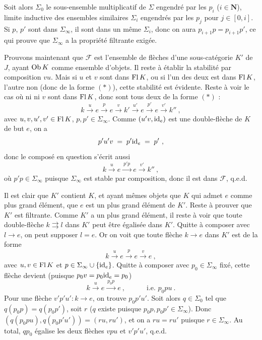 Soit alors $\Sigma_0$ le sous-ensemble multiplicatif de $\Sigma$ engendré par les $p_i$ ($i\in\mathbf{N}$), limite inductive des ensembles similaires $\Sigma_i$ engendrés par les $p_j$ pour $j\in[0,i]$. Si $p$, $p'$ sont dans $\Sigma_\infty$, il sont dans un même $\Sigma_i$, donc on aura $p_{i+1}p=p_{i+1}p'$, ce qui prouve que $\Sigma_\infty$ a la propriété filtrante exigée. %

Prouvons maintenant que $\mathcal{F}$ est l'ensemble de flèches d'une sous-catégorie $K'$ de $J$, ayant $\operatorname{Ob} K$ comme ensemble d'objets. Il reste à établir la stabilité par composition $vu$. Mais si $u$ et $v$ sont dans $\operatorname{Fl} K$, ou si l'un des deux est dans $\operatorname{Fl} K$, l'autre non (donc de la forme $(*)$), cette stabilité est évidente. Reste à voir le cas où ni ni $v$ sont dans $\operatorname{Fl} K$, donc sont tous deux de la forme $(*)$ :
\[
k \xrightarrow{\ u\ } e \xrightarrow{\ p\ } e \xrightarrow{\ v\ } k' \xrightarrow{\ u'\ } e \xrightarrow{\ p'\ } e \xrightarrow{\ v'\ } k''\ ,
\]
avec $u,v,u',v'\in\operatorname{Fl} K$, $p,p'\in\Sigma_\infty$. Comme $(u'v,\mathrm{id}_e)$ est une double-flèche de
$K$ de but $e$, on a
\[
p'u'v \;=\; p'\id_e \;=\; p'\ ,
\]
donc le composé en question s'écrit aussi
\[
k \xrightarrow{\ u\ } e \xrightarrow{\ p'p\ } e \xrightarrow{\ v'\ } k''\ ,
\]
où $p'p\in\Sigma_\infty$ puisque $\Sigma_\infty$ est stable par composition, donc il est dans $\mathcal{F}$, q.e.d.

Il est clair que $K'$ contient $K$, et ayant mêmes objets que $K$ qui admet $e$ comme plus grand élément, que $e$ est un plus grand élément de $K'$. Reste à prouver que $K'$ est filtrante. Comme $K'$ a un plus grand élément, il reste à voir que toute double-flèche $k\rightrightarrows l$ dans $K'$ peut être égalisée dans $K'$. Quitte à composer avec $l\longrightarrow e$, on peut supposer $l=e$. Or on voit que toute flèche $k\longrightarrow e$ dans $K'$ est de la forme
\[
k \xrightarrow{\ u\ } e \xrightarrow{\ p\ } e \xrightarrow{\ v\ } e\ ,
\]
avec $u,v\in\operatorname{Fl} K$ et $p\in\Sigma_\infty\cup\{\mathrm{id}_e\}$. Quitte à composer avec $p_0\in\Sigma_\infty$ fixé, cette flèche devient (puisque $p_0v=p_0\mathrm{id}_e=p_0$)
\[
k \xrightarrow{\ u\ } e \xrightarrow{\ p_0p\ } e\ , \qquad\quad \text{i.e. } p_0pu\ .
\]
Pour une flèche $v'p'u' : k\longrightarrow e$, on trouve $p_0p'u'$. Soit alors $q\in\Sigma_0$ tel que $q(p_0p)=q(p_0p')$, soit $r$ ($q$ existe puisque $p_0p,p_0p'\in\Sigma_\infty$). Donc $(q(p_0pu),q(p_0p'u'))=(ru,ru')$, et on a $ru=ru'$ puisque $r\in\Sigma_\infty$. Au total, $qp_0$ égalise les deux flèches $vpu$ et $v'p'u'$, q.e.d.

